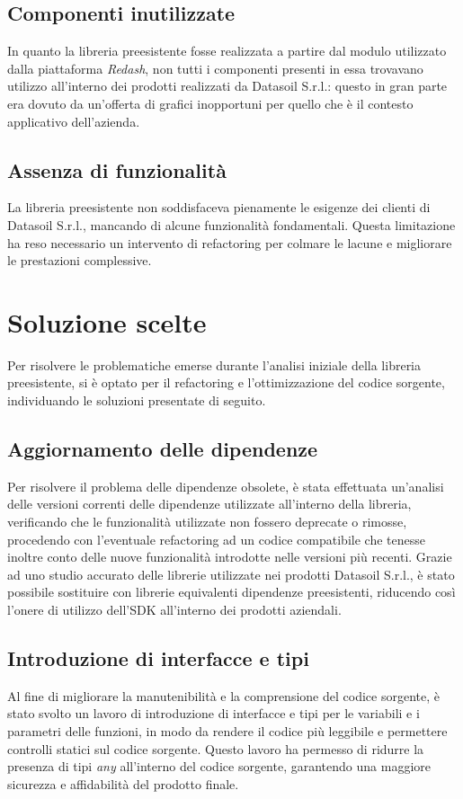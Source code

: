 \subsection{Componenti inutilizzate}
In quanto la libreria preesistente fosse realizzata a partire dal modulo utilizzato dalla piattaforma \textit{Redash}, non tutti i componenti presenti
in essa trovavano utilizzo all'interno dei prodotti realizzati da Datasoil S.r.l.: questo in gran parte era dovuto da un'offerta di grafici inopportuni
per quello che è il contesto applicativo dell'azienda.

\subsection{Assenza di funzionalità}
La libreria preesistente non soddisfaceva pienamente le esigenze dei clienti di Datasoil S.r.l., mancando di alcune funzionalità fondamentali.
Questa limitazione ha reso necessario un intervento di refactoring per colmare le lacune e migliorare le prestazioni complessive.

\section{Soluzione scelte}
Per risolvere le problematiche emerse durante l'analisi iniziale della libreria preesistente, si è optato per il refactoring e l'ottimizzazione
del codice sorgente, individuando le soluzioni presentate di seguito.

\subsection{Aggiornamento delle dipendenze}
Per risolvere il problema delle dipendenze obsolete, è stata effettuata un'analisi delle versioni correnti delle dipendenze utilizzate all'interno della libreria,
verificando che le funzionalità utilizzate non fossero deprecate o rimosse, procedendo con l'eventuale refactoring ad un codice compatibile che tenesse inoltre conto
delle nuove funzionalità introdotte nelle versioni più recenti. \newline
Grazie ad uno studio accurato delle librerie utilizzate nei prodotti Datasoil S.r.l., è stato possibile sostituire con librerie equivalenti dipendenze preesistenti,
riducendo così l'onere di utilizzo dell'SDK all'interno dei prodotti aziendali.

\subsection{Introduzione di interfacce e tipi}
Al fine di migliorare la manutenibilità e la comprensione del codice sorgente, è stato svolto un lavoro di introduzione di interfacce e tipi per le variabili e i parametri
delle funzioni, in modo da rendere il codice più leggibile e permettere controlli statici sul codice sorgente. \newline
Questo lavoro ha permesso di ridurre la presenza di tipi \textit{any} all'interno del codice sorgente, garantendo una maggiore sicurezza e affidabilità del prodotto finale.

